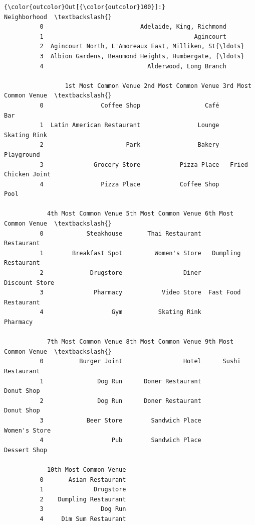 \documentclass[11pt]{article}
\begin{document}
\begin{Verbatim}[commandchars=\\\{\}]
{\color{outcolor}Out[{\color{outcolor}100}]:}                                         Neighborhood  \textbackslash{}
          0                           Adelaide, King, Richmond   
          1                                          Agincourt   
          2  Agincourt North, L'Amoreaux East, Milliken, St{\ldots}   
          3  Albion Gardens, Beaumond Heights, Humbergate, {\ldots}   
          4                             Alderwood, Long Branch   
          
                 1st Most Common Venue 2nd Most Common Venue 3rd Most Common Venue  \textbackslash{}
          0                Coffee Shop                  Café                   Bar   
          1  Latin American Restaurant                Lounge          Skating Rink   
          2                       Park                Bakery            Playground   
          3              Grocery Store           Pizza Place   Fried Chicken Joint   
          4                Pizza Place           Coffee Shop                  Pool   
          
            4th Most Common Venue 5th Most Common Venue 6th Most Common Venue  \textbackslash{}
          0            Steakhouse       Thai Restaurant            Restaurant   
          1        Breakfast Spot         Women's Store   Dumpling Restaurant   
          2             Drugstore                 Diner        Discount Store   
          3              Pharmacy           Video Store  Fast Food Restaurant   
          4                   Gym          Skating Rink              Pharmacy   
          
            7th Most Common Venue 8th Most Common Venue 9th Most Common Venue  \textbackslash{}
          0          Burger Joint                 Hotel      Sushi Restaurant   
          1               Dog Run      Doner Restaurant            Donut Shop   
          2               Dog Run      Doner Restaurant            Donut Shop   
          3            Beer Store        Sandwich Place         Women's Store   
          4                   Pub        Sandwich Place          Dessert Shop   
          
            10th Most Common Venue  
          0       Asian Restaurant  
          1              Drugstore  
          2    Dumpling Restaurant  
          3                Dog Run  
          4     Dim Sum Restaurant  
\end{Verbatim}
            
\end{document}
